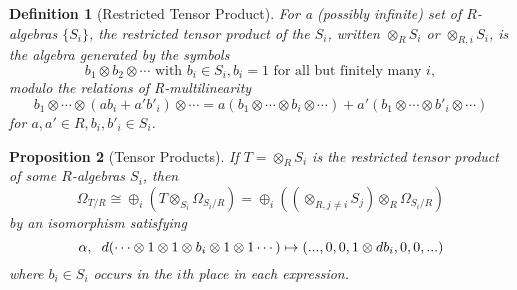 \documentclass{beamer}
\newtheorem{prop}{Proposition}
\newtheorem{defn}[prop]{Definition}
\begin{document}

\begin{frame}
\begin{footnotesize}

\begin{defn}[Restricted Tensor Product]
For a (possibly infinite) set of $R$-algebras $\{S_i\}$, the restricted tensor product of the $S_i$, written $\otimes_{R}S_i$ or $\otimes_{R,i}S_i$, is the algebra generated by the symbols
$$b_1\otimes b_2\otimes\cdots \text{ with }b_i\in S_i, b_i = 1\text{ for all but finitely many } i,$$ 
modulo the relations of R-multilinearity
$$b_1\otimes\cdots\otimes(ab_i+a'b'_i)\otimes\cdots = a(b_1\otimes\cdots\otimes b_i\otimes\cdots) + a'(b_1\otimes\cdots\otimes b'_i\otimes\cdots)$$
for $a,a'\in R, b_i,b'_i\in S_i$.
\end{defn}

\begin{prop}[Tensor Products]
If $T = \otimes_{R}S_i$ is the restricted tensor product of some $R$-algebras $S_i$, then 
$$\Omega_{T/R}\cong\oplus_i(T\otimes_{S_i}\Omega_{S_i/R}) = \oplus_i((\otimes_{R,j\neq i}S_j)\otimes_R\Omega_{S_i/R})$$
by an isomorphism satisfying 
$$\alpha,\hspace{2mm} d(\cdots\otimes 1\otimes 1\otimes b_i\otimes 1\otimes 1\cdots)\mapsto (...,0,0,1\otimes db_i,0,0,...) $$
where $b_i\in S_i$ occurs in the $i$th place in each expression.
\end{prop}

\end{footnotesize}
\end{frame}


\end{document}
